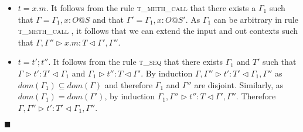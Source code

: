 \documentclass{article}
\newcommand{\tseq}{\textsc{t\_seq} }
\newcommand{\tmethc}{\textsc{t\_meth\_call} }
\newcommand{\typerule}[4]{#1 \triangleright #2 : #3 \triangleleft #4}
\newcommand{\qed}{$\blacksquare$}
\newenvironment{proof}{\vspace{1ex}\noindent{\bf Proof}\hspace{0.5em}}
  {\hfill\qed\vspace{1ex}}
\begin{document}
\begin{proof}
\begin{itemize}
\item $t = x.m$. It follows from the rule \tmethc that there exists
a $\Gamma_1$ such that $\Gamma = \Gamma_1, x : O@S$ and that $\Gamma' = \Gamma_1, x : O@S'$.
As $\Gamma_1$ can be arbitrary in rule \tmethc, it follows that we can
extend the input and out contexts such that
$\typerule{\Gamma, \Gamma''}{x.m}{T}{\Gamma', \Gamma''}$.

\item $t = t' ; t''$. It follows from the rule \tseq that there exists
$\Gamma_1$ and $T'$ such that $\typerule{\Gamma}{t'}{T'}{\Gamma_1}$
and $\typerule{\Gamma_1}{t''}{T}{\Gamma'}$. By induction
$\typerule{\Gamma, \Gamma''}{t'}{T'}{\Gamma_1, \Gamma''}$
as $dom(\Gamma_1) \subseteq dom(\Gamma)$ and therefore
$\Gamma_1$ and $\Gamma''$ are disjoint.
Similarly, as $dom(\Gamma_1) = dom(\Gamma')$, by induction
$\typerule{\Gamma_1, \Gamma''}{t''}{T}{\Gamma', \Gamma''}$.
Therefore $\typerule{\Gamma, \Gamma''}{t'}{T'}{\Gamma_1, \Gamma''}$.
\end{itemize}

\end{proof}
\end{document}
